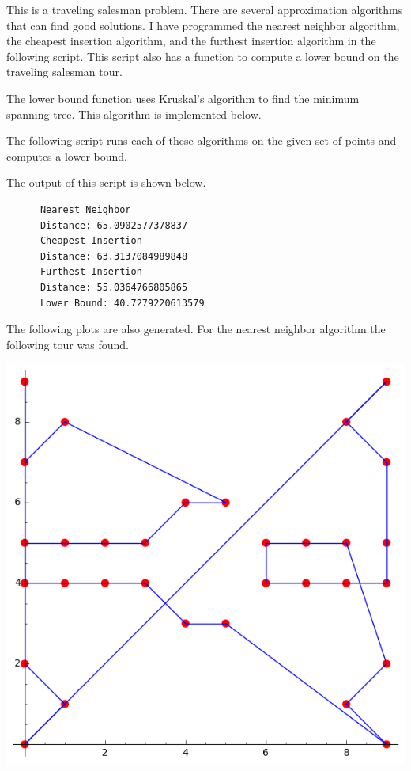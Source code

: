\documentclass[11pt, oneside]{article}
\begin{document}
\begin{enumerate}
    This is a traveling salesman problem.
    There are several approximation algorithms that can find good solutions.
    I have programmed the nearest neighbor algorithm, the cheapest insertion
    algorithm, and the furthest insertion algorithm in the following script.
    This script also has a function to compute a lower bound on the traveling
    salesman tour.
    
    The lower bound function uses Kruskal's algorithm to find the minimum spanning tree.
    This algorithm is implemented below.
    
    The following script runs each of these algorithms on the given set of
    points and computes a lower bound.
    
    The output of this script is shown below.
    \begin{verbatim}
      Nearest Neighbor
      Distance: 65.0902577378837
      Cheapest Insertion
      Distance: 63.3137084989848
      Furthest Insertion
      Distance: 55.0364766805865
      Lower Bound: 40.7279220613579
    \end{verbatim}
    The following plots are also generated.
    For the nearest neighbor algorithm the following tour was found.
    \begin{center}
      \includegraphics[scale=.5]{Figures/final_1.png}

\end{center}
\end{enumerate}
\end{document}
